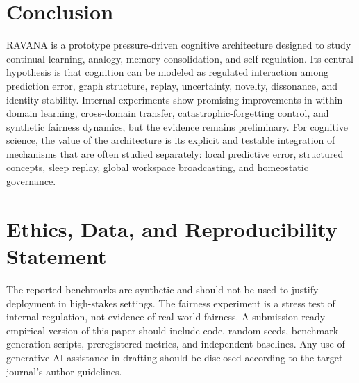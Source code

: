 \documentclass[11pt]{article}
\begin{document}
\section{Conclusion}
RAVANA is a prototype pressure-driven cognitive architecture designed to study continual learning, analogy, memory consolidation, and self-regulation. Its central hypothesis is that cognition can be modeled as regulated interaction among prediction error, graph structure, replay, uncertainty, novelty, dissonance, and identity stability. Internal experiments show promising improvements in within-domain learning, cross-domain transfer, catastrophic-forgetting control, and synthetic fairness dynamics, but the evidence remains preliminary. For cognitive science, the value of the architecture is its explicit and testable integration of mechanisms that are often studied separately: local predictive error, structured concepts, sleep replay, global workspace broadcasting, and homeostatic governance.

\section*{Ethics, Data, and Reproducibility Statement}
The reported benchmarks are synthetic and should not be used to justify deployment in high-stakes settings. The fairness experiment is a stress test of internal regulation, not evidence of real-world fairness. A submission-ready empirical version of this paper should include code, random seeds, benchmark generation scripts, preregistered metrics, and independent baselines. Any use of generative AI assistance in drafting should be disclosed according to the target journal's author guidelines.
\end{document}
